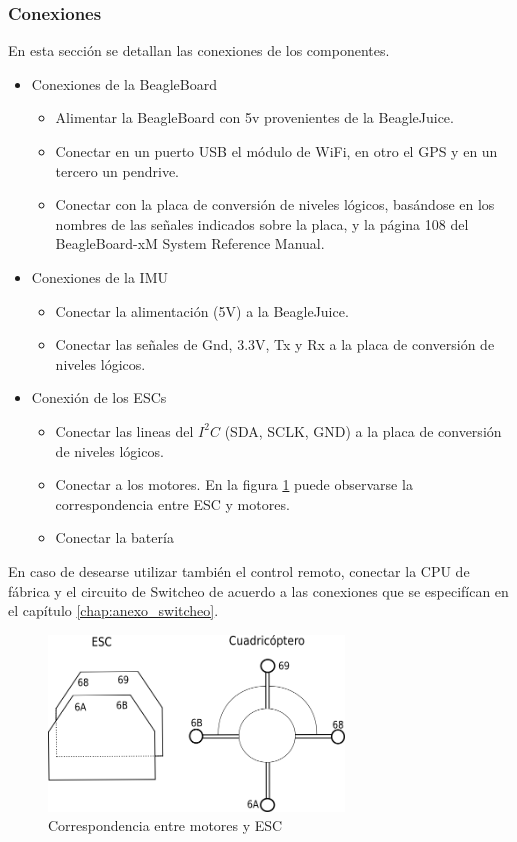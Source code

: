 \documentclass[main]{subfiles}
\begin{document}
\subsubsection{Conexiones}
En esta secci\'on se detallan las conexiones de los componentes.
\begin{itemize}
\item Conexiones de la BeagleBoard
	\begin{itemize}
	\item Alimentar la BeagleBoard con 5v provenientes de la BeagleJuice.
	\item Conectar en un puerto USB el módulo de WiFi, en otro el GPS y en un tercero un pendrive.
	\item Conectar con la placa de conversión de niveles lógicos, bas\'andose en los nombres de las se\~nales indicados sobre la placa, y la p\'agina 108 del BeagleBoard-xM System Reference Manual.
	\end{itemize}
\item Conexiones de la IMU
	\begin{itemize}
	\item Conectar la alimentaci\'on (5V) a la BeagleJuice.
	\item Conectar las señales de Gnd, 3.3V, Tx y Rx a la placa de conversión de niveles l\'ogicos.
	\end{itemize}
\item Conexión de los ESCs
	\begin{itemize}
	\item Conectar las lineas del $I^2C$ (SDA, SCLK, GND) a la placa de conversión de niveles l\'ogicos.
	\item Conectar a los motores. En la figura \ref{fig:conexion_motores} puede observarse la correspondencia entre ESC y motores.
	\item Conectar la bater\'ia
	\end{itemize}
\end{itemize}

En caso de desearse utilizar también el control remoto, conectar la CPU de f\'abrica y el circuito de Switcheo de acuerdo a las conexiones que se especif\'ican en el cap\'itulo \ref{chap:anexo_switcheo}.

\begin{figure}
	\centering
	\includegraphics[width=0.7\textwidth]{./pics_manual/diagrama.png}
	\caption{Correspondencia entre motores y ESC}
	\label{fig:conexion_motores}
\end{figure}
\end{document}
